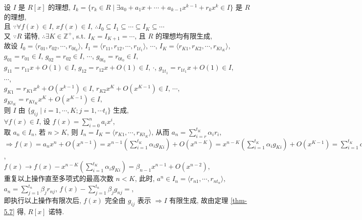 \documentclass{note}
\begin{document}
\begin{pf}
    设 $I$ 是 $R[x]$ 的理想, $I_k=\{r_k\in R\mid\exists a_0+a_1x+\cdots+a_{k-1}x^{k-1}+r_kx^k\in I\}$ 是 $R$ 的理想,\\
    且 $\because\forall f(x)\in I$, $xf(x)\in I$, $\therefore I_0\subseteq I_1\subseteq\cdots\subseteq I_K\subseteq\cdots$\\
    又 $\because R$ 诺特, $\therefore\exists K\in\mathbb{Z}^+$, s.t. $I_K=I_{K+1}=\cdots$, 且 $R$ 的理想均有限生成,\\
    故设 $I_0=\langle r_{01},r_{02},\cdots,r_{0t_0}\rangle$, $I_1=\langle r_{11},r_{12},\cdots,r_{1t_1}\rangle$, $\cdots$, $I_K=\langle r_{K1},r_{K2},\cdots,r_{Kt_K}\rangle$,\\
    $g_{01}=r_{01}\in I$, $g_{02}=r_{02}\in I$, $\cdots$, $g_{0t_0}=r_{0t_0}\in I$,\\
    $g_{11}=r_{11}x+O(1)\in I$, $g_{12}=r_{12}x+O(1)\in I$, $\cdot$, $g_{1t_1}=r_{1t_1}x+O(1)\in I$,\\
    $\cdots$,\\
    $g_{K1}=r_{K1}x^k+O(x^{k-1})\in I$, $r_{K2}x^K+O(x^{K-1})\in I$, $\cdots$, $g_{Kt_K}=r_{Kt_K}x^K+O(x^{K-1})\in I$,\\
    则 $I$ 由 $\{g_{ij}\mid i=1,\cdots,K;j=1,\cdots t_i\}$ 生成,\\
    $\forall f(x)\in I$, 设 $f(x)=\sum_{i=0}^na_ix^i$,\\
    取 $a_n\in I_n$, 若 $n>K$, 则 $I_n=I_K=\langle r_{K1},\cdots,r_{Kt_K}\rangle$, 从而 $a_n=\sum_{i=r}^{t_K}\alpha_ir_i$,\\
    $\Longrightarrow f(x)=a_nx^n+O(x^{n-1})=x^{n-1}\left(\sum_{i=1}^{t_K}\alpha_ig_{Ki}\right)+O(x^{n-K})=x^{n-K}\left(\sum_{i=1}^{t_K}\alpha_ig_{Ki}\right)+O(x^{K-1})=\sum_{i=1}^{t_K}\alpha_ir_{Ki}x^n+O(x^{n-1})$,\\
    $f(x)\rightarrow f(x)-x^{n-K}\left(\sum_{i=1}^{t_K}\alpha_ig_{Ki}\right)=\beta_{n-1}x^{n-1}+O(x^{n-2})$,\\
    重复以上操作直至多项式的最高次数 $n<K$, 此时, $a^n\in I_n=\langle r_{n1},\cdots,r_{nt_n}\rangle$, $a_n=\sum_{j=1}^{t_n}\beta_jr_{nj}$, $f(x)-\sum_{j=1}^{t_n}\beta_jg_{nj}=$,\\
    即执行以上操作有限次后, $f(x)$ 完全由 $g_{ij}$ 表示 $\Longrightarrow I$ 有限生成, 故由定理 \ref{thm-5.7} 得, $R[x]$ 诺特.
\end{pf}
\end{document}
